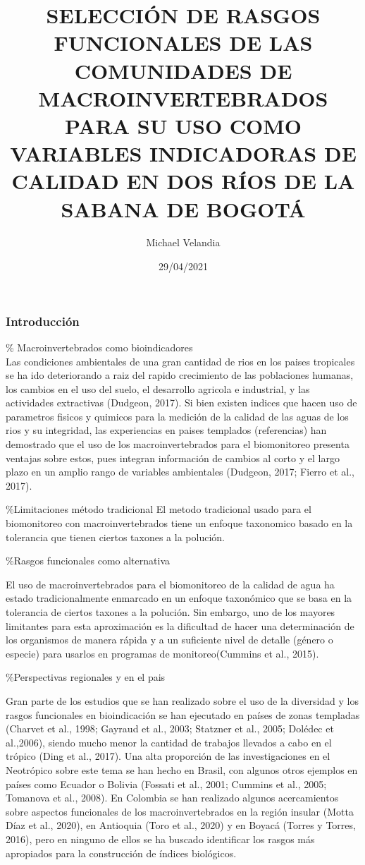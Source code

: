 \documentclass[
]{article}
\title{SELECCIÓN DE RASGOS FUNCIONALES DE LAS COMUNIDADES DE MACROINVERTEBRADOS
PARA SU USO COMO VARIABLES INDICADORAS DE CALIDAD EN DOS RÍOS DE LA
SABANA DE BOGOTÁ}
\author{Michael Velandia}
\date{29/04/2021}
\begin{document}
\maketitle

\hypertarget{introducciuxf3n}{%
\subsubsection{Introducción}\label{introducciuxf3n}}

\% Macroinvertebrados como bioindicadores\\
Las condiciones ambientales de una gran cantidad de rios en los paises
tropicales se ha ido deteriorando a raiz del rapido crecimiento de las
poblaciones humanas, los cambios en el uso del suelo, el desarrollo
agricola e industrial, y las actividades extractivas (Dudgeon, 2017). Si
bien existen indices que hacen uso de parametros fisicos y quimicos para
la medición de la calidad de las aguas de los rios y su integridad, las
experiencias en paises templados (referencias) han demostrado que el uso
de los macroinvertebrados para el biomonitoreo presenta ventajas sobre
estos, pues integran información de cambios al corto y el largo plazo en
un amplio rango de variables ambientales (Dudgeon, 2017; Fierro et al.,
2017).

\%Limitaciones método tradicional El metodo tradicional usado para el
biomonitoreo con macroinvertebrados tiene un enfoque taxonomico basado
en la tolerancia que tienen ciertos taxones a la polución.

\%Rasgos funcionales como alternativa

El uso de macroinvertebrados para el biomonitoreo de la calidad de agua
ha estado tradicionalmente enmarcado en un enfoque taxonómico que se
basa en la tolerancia de ciertos taxones a la polución. Sin embargo, uno
de los mayores limitantes para esta aproximación es la dificultad de
hacer una determinación de los organismos de manera rápida y a un
suficiente nivel de detalle (género o especie) para usarlos en programas
de monitoreo(Cummins et al., 2015).

\%Perspectivas regionales y en el pais

Gran parte de los estudios que se han realizado sobre el uso de la
diversidad y los rasgos funcionales en bioindicación se han ejecutado en
países de zonas templadas (Charvet et al., 1998; Gayraud et al., 2003;
Statzner et al., 2005; Dolédec et al.,2006), siendo mucho menor la
cantidad de trabajos llevados a cabo en el trópico (Ding et al., 2017).
Una alta proporción de las investigaciones en el Neotrópico sobre este
tema se han hecho en Brasil, con algunos otros ejemplos en países como
Ecuador o Bolivia (Fossati et al., 2001; Cummins et al., 2005; Tomanova
et al., 2008). En Colombia se han realizado algunos acercamientos sobre
aspectos funcionales de los macroinvertebrados en la región insular
(Motta Díaz et al., 2020), en Antioquia (Toro et al., 2020) y en Boyacá
(Torres y Torres, 2016), pero en ninguno de ellos se ha buscado
identificar los rasgos más apropiados para la construcción de índices
biológicos.
\end{document}
